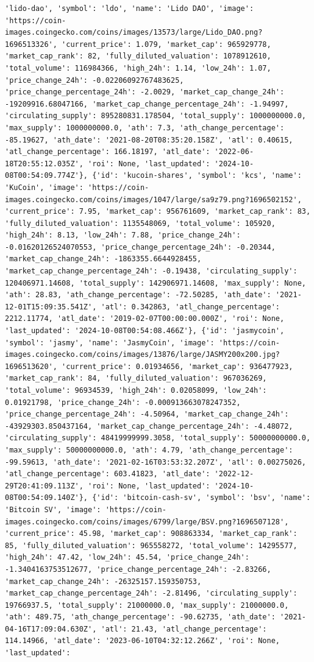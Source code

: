 \documentclass[
  letterpaper,
  DIV=11,
  numbers=noendperiod]{scrreprt}
\begin{document}
\begin{verbatim}
'lido-dao', 'symbol': 'ldo', 'name': 'Lido DAO', 'image': 'https://coin-images.coingecko.com/coins/images/13573/large/Lido_DAO.png?1696513326', 'current_price': 1.079, 'market_cap': 965929778, 'market_cap_rank': 82, 'fully_diluted_valuation': 1078912610, 'total_volume': 116984366, 'high_24h': 1.14, 'low_24h': 1.07, 'price_change_24h': -0.02206092767483625, 'price_change_percentage_24h': -2.0029, 'market_cap_change_24h': -19209916.68047166, 'market_cap_change_percentage_24h': -1.94997, 'circulating_supply': 895280831.178504, 'total_supply': 1000000000.0, 'max_supply': 1000000000.0, 'ath': 7.3, 'ath_change_percentage': -85.19627, 'ath_date': '2021-08-20T08:35:20.158Z', 'atl': 0.40615, 'atl_change_percentage': 166.18197, 'atl_date': '2022-06-18T20:55:12.035Z', 'roi': None, 'last_updated': '2024-10-08T00:54:09.774Z'}, {'id': 'kucoin-shares', 'symbol': 'kcs', 'name': 'KuCoin', 'image': 'https://coin-images.coingecko.com/coins/images/1047/large/sa9z79.png?1696502152', 'current_price': 7.95, 'market_cap': 956761609, 'market_cap_rank': 83, 'fully_diluted_valuation': 1135548069, 'total_volume': 105920, 'high_24h': 8.13, 'low_24h': 7.88, 'price_change_24h': -0.01620126524070553, 'price_change_percentage_24h': -0.20344, 'market_cap_change_24h': -1863355.6644928455, 'market_cap_change_percentage_24h': -0.19438, 'circulating_supply': 120406971.14608, 'total_supply': 142906971.14608, 'max_supply': None, 'ath': 28.83, 'ath_change_percentage': -72.50285, 'ath_date': '2021-12-01T15:09:35.541Z', 'atl': 0.342863, 'atl_change_percentage': 2212.11774, 'atl_date': '2019-02-07T00:00:00.000Z', 'roi': None, 'last_updated': '2024-10-08T00:54:08.466Z'}, {'id': 'jasmycoin', 'symbol': 'jasmy', 'name': 'JasmyCoin', 'image': 'https://coin-images.coingecko.com/coins/images/13876/large/JASMY200x200.jpg?1696513620', 'current_price': 0.01934656, 'market_cap': 936477923, 'market_cap_rank': 84, 'fully_diluted_valuation': 967036269, 'total_volume': 96934539, 'high_24h': 0.02058099, 'low_24h': 0.01921798, 'price_change_24h': -0.000913663078247352, 'price_change_percentage_24h': -4.50964, 'market_cap_change_24h': -43929303.850437164, 'market_cap_change_percentage_24h': -4.48072, 'circulating_supply': 48419999999.3058, 'total_supply': 50000000000.0, 'max_supply': 50000000000.0, 'ath': 4.79, 'ath_change_percentage': -99.59613, 'ath_date': '2021-02-16T03:53:32.207Z', 'atl': 0.00275026, 'atl_change_percentage': 603.41823, 'atl_date': '2022-12-29T20:41:09.113Z', 'roi': None, 'last_updated': '2024-10-08T00:54:09.140Z'}, {'id': 'bitcoin-cash-sv', 'symbol': 'bsv', 'name': 'Bitcoin SV', 'image': 'https://coin-images.coingecko.com/coins/images/6799/large/BSV.png?1696507128', 'current_price': 45.98, 'market_cap': 908863334, 'market_cap_rank': 85, 'fully_diluted_valuation': 965558272, 'total_volume': 14295577, 'high_24h': 47.42, 'low_24h': 45.54, 'price_change_24h': -1.3404163753512677, 'price_change_percentage_24h': -2.83266, 'market_cap_change_24h': -26325157.159350753, 'market_cap_change_percentage_24h': -2.81496, 'circulating_supply': 19766937.5, 'total_supply': 21000000.0, 'max_supply': 21000000.0, 'ath': 489.75, 'ath_change_percentage': -90.62735, 'ath_date': '2021-04-16T17:09:04.630Z', 'atl': 21.43, 'atl_change_percentage': 114.14966, 'atl_date': '2023-06-10T04:32:12.266Z', 'roi': None, 'last_updated': 
\end{verbatim}
\end{document}

